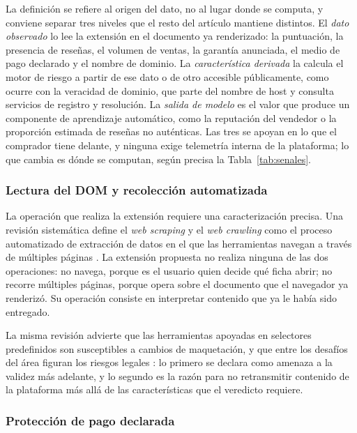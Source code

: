 La definición se refiere al origen del dato, no al lugar donde se computa, y conviene separar
tres niveles que el resto del artículo mantiene distintos. El \emph{dato observado} lo lee la
extensión en el documento ya renderizado: la puntuación, la presencia de reseñas, el volumen de
ventas, la garantía anunciada, el medio de pago declarado y el nombre de dominio. La
\emph{característica derivada} la calcula el motor de riesgo a partir de ese dato o de otro
accesible públicamente, como ocurre con la veracidad de dominio, que parte del nombre de host y
consulta servicios de registro y resolución. La \emph{salida de modelo} es el valor que produce
un componente de aprendizaje automático, como la reputación del vendedor o la proporción
estimada de reseñas no auténticas. Las tres se apoyan en lo que el comprador tiene delante, y
ninguna exige telemetría interna de la plataforma; lo que cambia es dónde se computan, según
precisa la Tabla~\ref{tab:senales}.

\subsubsection{Lectura del DOM y recolección automatizada}

La operación que realiza la extensión requiere una caracterización precisa. Una revisión
sistemática define el \textit{web scraping} y el \textit{web crawling} como el proceso
automatizado de extracción de datos en el que las herramientas navegan a través de múltiples
páginas \cite{ref24}. La extensión propuesta no realiza ninguna de las dos operaciones: no
navega, porque es el usuario quien decide qué ficha abrir; no recorre múltiples páginas, porque
opera sobre el documento que el navegador ya renderizó. Su operación consiste en interpretar
contenido que ya le había sido entregado.

La misma revisión advierte que las herramientas apoyadas en selectores predefinidos son
susceptibles a cambios de maquetación, y que entre los desafíos del área figuran los riesgos
legales \cite{ref24}: lo primero se declara como amenaza a la validez más adelante, y lo
segundo es la razón para no retransmitir contenido de la plataforma más allá de las
características que el veredicto requiere.

\subsubsection{Protección de pago declarada}

